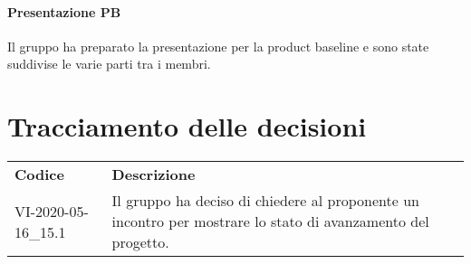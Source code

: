 \documentclass{article}
\begin{document}
\paragraph*{Presentazione PB}
Il gruppo ha preparato la presentazione per la product baseline e sono state suddivise le varie parti tra i membri.

\section{Tracciamento delle decisioni}
\begin{table}[H]
  \centering
  \begin{tabular}{p{4cm}|p{12cm}}
    \rowcolor{lightgray}
    \textbf{Codice}  & \textbf{Descrizione}      \\
    VI-2020-05-16\_15.1 & Il gruppo ha deciso di chiedere al proponente un incontro per mostrare lo stato di avanzamento del progetto. \\
  \end{tabular}
\end{table}
\end{document}
